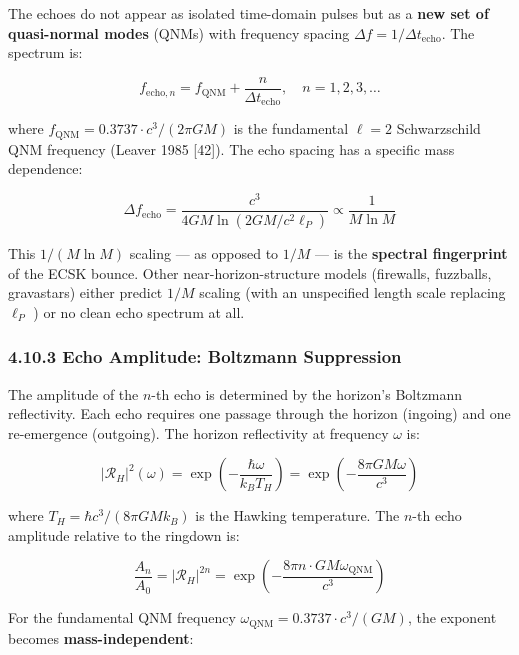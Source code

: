 \documentclass[11pt,a4paper]{article}
\theoremstyle{definition}\newtheorem{definition}{Definition}
\theoremstyle{remark}\newtheorem{remark}{Remark}
\begin{document}
The echoes do not appear as isolated time-domain pulses but as a \textbf{new set of quasi-normal modes} (QNMs) with frequency spacing $\Delta f = 1/\Delta t_{\text{echo}}$. The spectrum is:


\begin{equation}
f_{\text{echo},n} = f_{\text{QNM}} + \frac{n}{\Delta t_{\text{echo}}}, \quad n = 1, 2, 3, \ldots
\end{equation}


where $f_{\text{QNM}} = 0.3737 \cdot c^3/(2\pi G M)$ is the fundamental $\ell = 2$ Schwarzschild QNM frequency (Leaver 1985 [42]). The echo spacing has a specific mass dependence:


\begin{equation}
\Delta f_{\text{echo}} = \frac{c^3}{4GM \ln(2GM / c^2 \ell_P)} \propto \frac{1}{M \ln M}
\end{equation}


This $1/(M \ln M)$ scaling — as opposed to $1/M$ — is the \textbf{spectral fingerprint} of the ECSK bounce. Other near-horizon-structure models (firewalls, fuzzballs, gravastars) either predict $1/M$ scaling (with an unspecified length scale replacing $\ell_P$ ) or no clean echo spectrum at all.
\subsubsection{4.10.3 Echo Amplitude: Boltzmann Suppression}

The amplitude of the $n$-th echo is determined by the horizon's Boltzmann reflectivity. Each echo requires one passage through the horizon (ingoing) and one re-emergence (outgoing). The horizon reflectivity at frequency $\omega$ is:


\begin{equation}
|\mathcal{R}_H|^2(\omega) = \exp\!\left(-\frac{\hbar\omega}{k_B T_H}\right) = \exp\!\left(-\frac{8\pi G M \omega}{c^3}\right)
\end{equation}


where $T_H = \hbar c^3/(8\pi G M k_B)$ is the Hawking temperature. The $n$-th echo amplitude relative to the ringdown is:


\begin{equation}
\frac{A_n}{A_0} = |\mathcal{R}_H|^{2n} = \exp\!\left(-\frac{8\pi n \cdot G M \omega_{\text{QNM}}}{c^3}\right)
\end{equation}


For the fundamental QNM frequency $\omega_{\text{QNM}} = 0.3737 \cdot c^3/(GM)$, the exponent becomes \textbf{mass-independent}:
\end{document}
